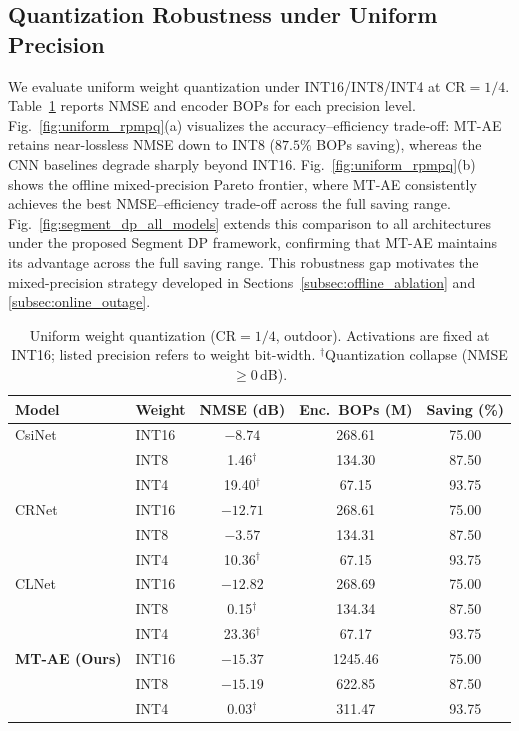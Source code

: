 \documentclass[conference]{IEEEtran}
\begin{document}
\subsection{Quantization Robustness under Uniform Precision}
\label{subsec:quant_robust}
We evaluate uniform weight quantization under INT16/INT8/INT4 at $\mathrm{CR}=1/4$.
Table~\ref{tab:uniform_quant_cr4} reports NMSE and encoder BOPs for each precision level.
Fig.~\ref{fig:uniform_rpmpq}(a) visualizes the accuracy--efficiency trade-off: MT-AE retains near-lossless NMSE down to INT8 ($87.5\%$ BOPs saving), whereas the CNN baselines degrade sharply beyond INT16.
Fig.~\ref{fig:uniform_rpmpq}(b) shows the offline mixed-precision Pareto frontier, where MT-AE consistently achieves the best NMSE--efficiency trade-off across the full saving range.
Fig.~\ref{fig:segment_dp_all_models} extends this comparison to all architectures under the proposed Segment DP framework, confirming that MT-AE maintains its advantage across the full saving range.
This robustness gap motivates the mixed-precision strategy developed in Sections~\ref{subsec:offline_ablation} and \ref{subsec:online_outage}.

\begin{table}[t]
\centering
\caption{Uniform weight quantization ($\mathrm{CR}=1/4$, outdoor). Activations are fixed at INT16; listed precision refers to weight bit-width. $^\dagger$Quantization collapse (NMSE $\ge 0$\,dB).}
\label{tab:uniform_quant_cr4}
\setlength{\tabcolsep}{4pt}
\begin{tabular}{llccc}
\toprule
Model & Weight & NMSE (dB) & Enc.\ BOPs (M) & Saving (\%) \\
\midrule
CsiNet & INT16 & $-8.74$  & 268.61 & 75.00 \\
       & INT8  &   1.46$^\dagger$   & 134.30 & 87.50 \\
       & INT4  &  19.40$^\dagger$   &  67.15 & 93.75 \\
\midrule
CRNet  & INT16 & $-12.71$ & 268.61 & 75.00 \\
       & INT8  &  $-3.57$ & 134.31 & 87.50 \\
       & INT4  &   10.36$^\dagger$  &  67.15 & 93.75 \\
\midrule
CLNet  & INT16 & $-12.82$ & 268.69 & 75.00 \\
       & INT8  &   0.15$^\dagger$   & 134.34 & 87.50 \\
       & INT4  &  23.36$^\dagger$   &  67.17 & 93.75 \\
\midrule
\textbf{MT-AE (Ours)} & INT16 & $\mathbf{-15.37}$ & 1245.46 & 75.00 \\
             & INT8  & $\mathbf{-15.19}$ &  622.85 & 87.50 \\
             & INT4  &   0.03$^\dagger$   &  311.47 & 93.75 \\
\bottomrule
\end{tabular}
\end{table}
\end{document}
